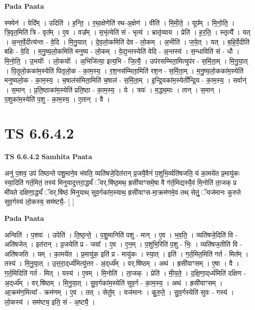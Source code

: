 \documentclass[17pt]{extarticle}
\begin{document}
\textbf{Pada Paata} \newline

स्फ्येन॑ । वेदि᳚म् । उदिति॑ । ह॒न्ति॒ । र॒था॒क्षेणेति॑ रथ-अ॒क्षेण॑ । वीति॑ । मि॒मी॒ते॒ । यूप᳚म् । मि॒नो॒ति॒ । त्रि॒वृत॒मिति॑ त्रि - वृत᳚म् । ए॒व । वज्र᳚म् । स॒भृंत्येति॑ सं - भृत्य॑ । भ्रातृ॑व्याय । प्रेति॑ । ह॒र॒ति॒ । स्तृत्यै᳚ । यत् । अ॒न्त॒र्वे॒दीत्य॑न्तः - वे॒दि । मि॒नु॒यात् । दे॒व॒लो॒कमिति॑ देव - लो॒कम् । अ॒भीति॑ । ज॒ये॒त् । यत् । ब॒हि॒र्वे॒दीति॑ बहिः - वे॒दि । म॒नु॒ष्य॒लो॒कमिति॑ मनुष्य - लो॒कम् । वे॒द्य॒न्तस्येति॑ वेदि - अ॒न्तस्य॑ । स॒न्धाविति॑ सं - धौ । मि॒नो॒ति॒ । उ॒भयोः᳚ । लो॒कयोः᳚ । अ॒भिजि॑त्या॒ इत्य॒भि - जि॒त्यै॒ । उप॑रसम्मिता॒मित्युप॑र - स॒मिं॒ता॒म् । मि॒नु॒या॒त् । पि॒तृ॒लो॒कका॑म॒स्येति॑ पितृलो॒क - का॒म॒स्य॒ । र॒श॒नस॑म्मिता॒मिति॑ रश॒न - स॒मिं॒ता॒म् । म॒नु॒ष्य॒लो॒कका॑म॒स्येति॑ मनुष्यलो॒क - का॒म॒स्य॒ । च॒षाल॑संमिता॒मिति॑ च॒षाल॑ - स॒मिं॒ता॒म् । इ॒न्द्रि॒यका॑म॒स्येती᳚न्द्रि॒य - का॒म॒स्य॒ । सर्वान्॑ । स॒मान् । प्र॒ति॒ष्ठाका॑म॒स्येति॑ प्रति॒ष्ठा - का॒म॒स्य॒ । ये । त्रयः॑ । म॒द्ध्य॒माः । तान् । स॒मान् । प॒शुका॑म॒स्येति॑ प॒शु - का॒म॒स्य॒ । ए॒तान् । वै ।  \newline




\section*{ TS 6.6.4.2 }

\textbf{TS 6.6.4.2 } \newline
\textbf{Samhita Paata} \newline

अनु॑ प॒शव॒ उप॑ तिष्ठन्ते पशु॒माने॒व भ॑वति॒ व्यति॑षजे॒दित॑रान् प्र॒जयै॒वैनं॑ प॒शुभि॒र्व्यति॑षजति॒ यं का॒मये॑त प्र॒मायु॑कः स्या॒दिति॑ गर्त॒मितं॒ तस्य॑ मिनुयादुत्तरा॒र्द्ध्यं॑ ॅवर्.षि॑ष्ठ॒मथ॒ ह्रसी॑याꣳसमे॒षा वै ग॑र्त॒मिद्यस्यै॒वं मि॒नोति॑ ता॒जक् प्र मी॑यते दक्षिणा॒र्द्ध्यं॑ ॅवर्.षि॑ष्ठं मिनुयाथ् सुव॒र्गका॑म॒स्याथ॒ ह्रसी॑याꣳस-मा॒क्रम॑णमे॒व तथ् सेतुं॒ ॅयज॑मानः कुरुते सुव॒र्गस्य॑ लो॒कस्य॒ सम॑ष्ट्यै॒- [  ] \newline

\textbf{Pada Paata} \newline

अन्विति॑ । प॒शवः॑ । उपेति॑ । ति॒ष्ठ॒न्ते॒ । प॒शु॒मानिति॑ पशु - मान् । ए॒व । भ॒व॒ति॒ । व्यति॑षजे॒दिति॑ वि - अति॑षजेत् । इत॑रान् । प्र॒जयेति॑ प्र - जया᳚ । ए॒व । ए॒न॒म् । प॒शुभि॒रिति॑ प॒शु - भिः॒ । व्यति॑षज॒तीति॑ वि - अति॑षजति । यम् । का॒मये॑त । प्र॒मायु॑क॒ इति॑ प्र - मायु॑कः । स्या॒त् । इति॑ । ग॒र्त॒मित॒मिति॑ गर्त - मित᳚म् । तस्य॑ । मि॒नु॒या॒त् । उ॒त्त॒रा॒द्‌र्ध्य॑मित्यु॑त्तर - अ॒द्‌र्ध्य᳚म् । वर्.षि॑ष्ठम् । अथ॑ । ह्रसी॑याꣳसम् । ए॒षा । वै । ग॒र्त॒मिदिति॑ गर्त - मित् । यस्य॑ । ए॒वम् । मि॒नोति॑ । ता॒जक् । प्रेति॑ । मी॒य॒ते॒ । द॒क्षि॒णा॒द्‌र्ध्य॑मिति॑ दक्षिण - अ॒द्‌र्ध्य᳚म् । वर्.षि॑ष्ठम् । मि॒नु॒या॒त् । सु॒व॒र्गका॑म॒स्येति॑ सुव॒र्ग - का॒म॒स्य॒ । अथ॑ । ह्रसी॑याꣳसम् । आ॒क्रम॑ण॒मित्या᳚ - क्रम॑णम् । ए॒व । तत् । सेतु᳚म् । यज॑मानः । कु॒रु॒ते॒ । सु॒व॒र्गस्येति॑ सुवः - गस्य॑ । लो॒कस्य॑ । सम॑ष्ट्य॒ इति॒ सं - अ॒ष्ट्यै॒ ।  \newline
\end{document}
